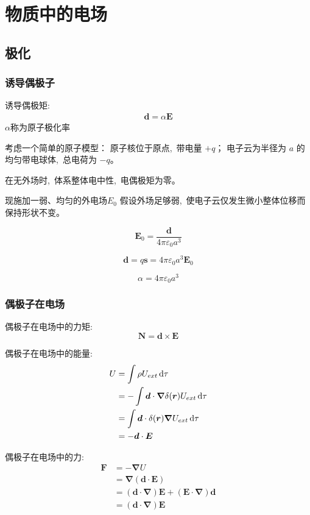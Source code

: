 \cleardoublepage

\section{物质中的电场}
\subsection{极化}
\subsubsection{诱导偶极子}
诱导偶极矩:
\begin{align*}
    \boldsymbol{d}=\alpha\boldsymbol{E}
\end{align*}
$\alpha$称为原子极化率

考虑一个简单的原子模型：  
原子核位于原点, \,带电量 $+q$；  
电子云为半径为 $a$ 的均匀带电球体, \,总电荷为 $-q$。

在无外场时, \,体系整体电中性, \,电偶极矩为零。

现施加一弱、均匀的外电场$E_0$
假设外场足够弱, \,使电子云仅发生微小整体位移而保持形状不变。


\[
\boldsymbol E_{0}
=
\frac{\boldsymbol d}{4\pi\varepsilon_0 a^3}
\]

\[
\boldsymbol d
=
q\boldsymbol s
=
4\pi\varepsilon_0 a^3\boldsymbol E_0
\]


\begin{equation}{
\alpha = 4\pi\varepsilon_0 a^3
}
\end{equation}
\subsubsection{偶极子在电场}
偶极子在电场中的力矩:
\begin{equation}
    \boldsymbol{N}=\boldsymbol{d}\times\boldsymbol{E}
\end{equation}

偶极子在电场中的能量:
\begin{align*}
    U&=\int \rho U_{ext}\dif \tau\\
    &=-\int \boldsymbol{d}\cdot\boldsymbol{\nabla}\delta(\boldsymbol{r}) U_{ext}\dif \tau\\
    &=\int \boldsymbol{d}\cdot\delta(\boldsymbol{r}) \boldsymbol{\nabla}U_{ext}\dif \tau\\
    &=-\boldsymbol{d}\cdot\boldsymbol{E}
\end{align*}

偶极子在电场中的力:
\begin{align*}
    \boldsymbol{F}&=-\boldsymbol{\nabla}U\\
    &=\boldsymbol{\nabla}(\boldsymbol{d}\cdot\boldsymbol{E})\\
    &=(\boldsymbol{d}\cdot\boldsymbol{\nabla})\boldsymbol{E}
    +(\boldsymbol{E}\cdot\boldsymbol{\nabla})\boldsymbol{d}\\
    &=(\boldsymbol{d}\cdot\boldsymbol{\nabla})\boldsymbol{E}
\end{align*}

